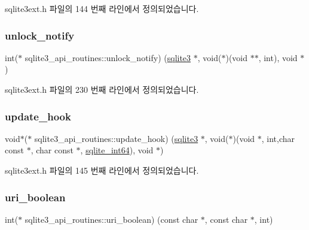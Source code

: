 sqlite3ext.\+h 파일의 144 번째 라인에서 정의되었습니다.

\mbox{\label{structsqlite3__api__routines_a600f476bdaff1340fa4fa6255e4f0394}} 
\subsubsection{\texorpdfstring{unlock\+\_\+notify}{unlock\_notify}}
{\footnotesize\ttfamily int($\ast$ sqlite3\+\_\+api\+\_\+routines\+::unlock\+\_\+notify) (\hyperlink{sqlite3_8h_a0ef6f2646262c8a9b24368d8ac140f69}{sqlite3} $\ast$, void($\ast$)(void $\ast$$\ast$, int), void $\ast$)}



sqlite3ext.\+h 파일의 230 번째 라인에서 정의되었습니다.

\mbox{\label{structsqlite3__api__routines_a85cffd9c5f77524f9b74292994b4b205}} 
\subsubsection{\texorpdfstring{update\+\_\+hook}{update\_hook}}
{\footnotesize\ttfamily void$\ast$($\ast$ sqlite3\+\_\+api\+\_\+routines\+::update\+\_\+hook) (\hyperlink{sqlite3_8h_a0ef6f2646262c8a9b24368d8ac140f69}{sqlite3} $\ast$, void($\ast$)(void $\ast$, int,char const  $\ast$, char const  $\ast$, \hyperlink{sqlite3_8h_a520a95f9080c018b2fade39885bd2e2a}{sqlite\+\_\+int64}), void $\ast$)}



sqlite3ext.\+h 파일의 145 번째 라인에서 정의되었습니다.

\mbox{\label{structsqlite3__api__routines_ac0aebc3fb86e2537e04be6db52d4a395}} 
\subsubsection{\texorpdfstring{uri\+\_\+boolean}{uri\_boolean}}
{\footnotesize\ttfamily int($\ast$ sqlite3\+\_\+api\+\_\+routines\+::uri\+\_\+boolean) (const char $\ast$, const char $\ast$, int)}




